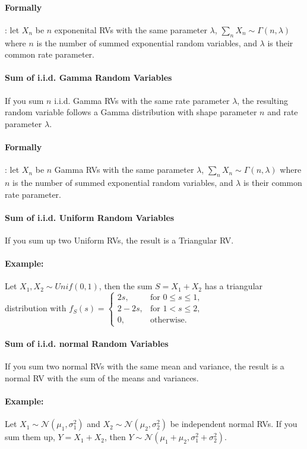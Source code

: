 \documentclass[a4paper]{article}
\begin{document}
\paragraph{Formally}: let $X_n$ be $n$ exponenital RVs with the same parameter $\lambda$, $ \sum\limits_n{X_n} \sim \Gamma(n, \lambda)$ 
where $n$ is the number of summed exponential random variables, and $\lambda$ is their common rate parameter.

\paragraph{Sum of i.i.d. Gamma Random Variables}
If you sum $n$ i.i.d. Gamma RVs with the same rate parameter $\lambda$, the resulting random variable follows a Gamma distribution with shape parameter $n$ and rate parameter $\lambda$.
\paragraph{Formally}: let $X_n$ be $n$ Gamma RVs with the same parameter $\lambda$, $ \sum\limits_n{X_n} \sim \Gamma(n, \lambda)$ 
where $n$ is the number of summed exponential random variables, and $\lambda$ is their common rate parameter.

\paragraph{Sum of i.i.d. Uniform Random Variables}
If you sum up two Uniform RVs, the result is a Triangular RV.
\paragraph{Example:} Let $X_1, X_2 \sim Unif(0, 1)$, then the sum $S = X_1 + X_2$ has a triangular distribution with $f_S(s) = \begin{cases} 2s, & \text{for } 0 \leq s \leq 1, \\ 2 - 2s, & \text{for } 1 < s \leq 2, \\ 0, & \text{otherwise}. \end{cases}$

\paragraph{Sum of i.i.d. normal Random Variables}
If you sum two normal RVs with the same mean and variance, the result is a normal RV with the sum of the means and variances.
\paragraph{Example:} Let $X_1 \sim \mathcal{N}(\mu_1, \sigma_1^2)$ and $X_2 \sim \mathcal{N}(\mu_2, \sigma_2^2)$ be independent normal RVs. If you sum them up, $Y = X_1 + X_2$, then $Y \sim \mathcal{N}(\mu_1 + \mu_2, \sigma_1^2 + \sigma_2^2)$.
\end{document}
